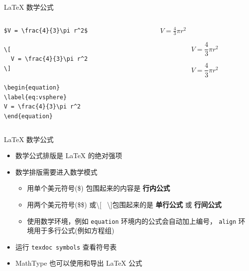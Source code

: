 \begin{frame}[fragile]{\LaTeX{} 数学公式}

\begin{columns}
\begin{column}{.5\textwidth}
\begin{lstlisting}[basicstyle=\ttfamily\small]
$V = \frac{4}{3}\pi r^2$

\[
  V = \frac{4}{3}\pi r^2
\]

\begin{equation}
\label{eq:vsphere}
V = \frac{4}{3}\pi r^2
\end{equation}
\end{lstlisting}
\end{column}

\begin{column}{.5\textwidth}
$V = \frac{4}{3}\pi r^2$

\[
  V = \frac{4}{3}\pi r^2
\]

\begin{equation}
\label{eq:vsphere}
V = \frac{4}{3}\pi r^2
\end{equation}
\end{column}
\end{columns}

\end{frame}

\begin{frame}{\LaTeX{} 数学公式}
\begin{itemize}
\item 数学公式排版是 \LaTeX{} 的绝对强项
\item 数学排版需要进入数学模式
	\begin{itemize}
	\item 用单个美元符号(\$) 包围起来的内容是 {\bf 行内公式}
  \item 用两个美元符号(\$\$) 或\textbackslash{}[~ \textbackslash{}]包围起来的是 {\bf 单行公式} 或 {\bf 行间公式}
	\item 使用数学环境，例如 \texttt{equation} 环境内的公式会自动加上编号，
		\texttt{align} 环境用于多行公式(例如方程组)
	\end{itemize}
\item 运行 \texttt{texdoc symbols} 查看符号表
\item MathType 也可以使用和导出 \LaTeX{} 公式
\end{itemize}
\end{frame}

